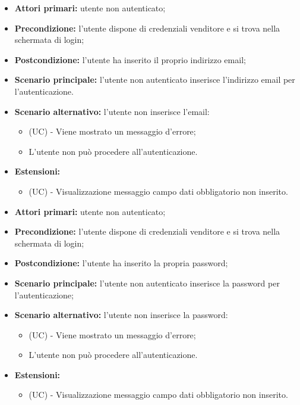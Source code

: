 \resetSubUC
{}
\begin{itemize}
	\item \textbf{Attori primari:} utente non autenticato;
	\item \textbf{Precondizione:} l'utente dispone di credenziali venditore e si trova nella schermata di login;
	\item \textbf{Postcondizione:} l'utente ha inserito il proprio indirizzo email;
	\item \textbf{Scenario principale:} l'utente non autenticato inserisce l'indirizzo email per l'autenticazione.
	\item \textbf{Scenario alternativo:} l'utente non inserisce l'email:
	\begin{itemize}
		\item (UC) - Viene mostrato un messaggio d'errore;
		\item L'utente non può procedere all'autenticazione.
	\end{itemize}
	\item \textbf{Estensioni:}
	\begin{itemize}
		\item (UC) - Visualizzazione messaggio campo dati obbligatorio non inserito.
	\end{itemize}
\end{itemize}

\begin{itemize}
	\item \textbf{Attori primari:} utente non autenticato;
	\item \textbf{Precondizione:} l'utente dispone di credenziali venditore e si trova nella schermata di login;
	\item \textbf{Postcondizione:} l'utente ha inserito la propria password;
	\item \textbf{Scenario principale:} l'utente non autenticato inserisce la password per l'autenticazione;
	\item \textbf{Scenario alternativo:} l'utente non inserisce la password:
	\begin{itemize}
		\item (UC) - Viene mostrato un messaggio d'errore;
		\item L'utente non può procedere all'autenticazione.
	\end{itemize}
	\item \textbf{Estensioni:}
	\begin{itemize}
		\item (UC) - Visualizzazione messaggio campo dati obbligatorio non inserito.
	\end{itemize}
\end{itemize}

